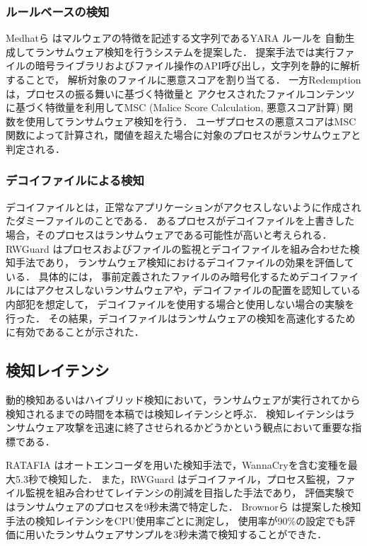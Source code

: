 \subsubsection{ルールベースの検知}
Medhatら \cite{yara-rule} はマルウェアの特徴を記述する文字列であるYARA \cite{yara-rule-doc} ルールを
自動生成してランサムウェア検知を行うシステムを提案した．
提案手法では実行ファイルの暗号ライブラリおよびファイル操作のAPI呼び出し，文字列を静的に解析することで，
解析対象のファイルに悪意スコアを割り当てる．
一方Redemption \cite{kharraz2017redemption} は，プロセスの振る舞いに基づく特徴量と
アクセスされたファイルコンテンツに基づく特徴量を利用してMSC (Malice Score Calculation, 悪意スコア計算) 関数を使用してランサムウェア検知を行う．
ユーザプロセスの悪意スコアはMSC関数によって計算され，閾値を超えた場合に対象のプロセスがランサムウェアと判定される．

\subsubsection{デコイファイルによる検知}
デコイファイルとは，正常なアプリケーションがアクセスしないように作成されたダミーファイルのことである．
あるプロセスがデコイファイルを上書きした場合，そのプロセスはランサムウェアである可能性が高いと考えられる．
RWGuard \cite{mehnaz2018rwguard} はプロセスおよびファイルの監視とデコイファイルを組み合わせた検知手法であり，
ランサムウェア検知におけるデコイファイルの効果を評価している．
具体的には，
事前定義されたファイルのみ暗号化するためデコイファイルにはアクセスしないランサムウェアや，デコイファイルの配置を認知している内部犯を想定して，
デコイファイルを使用する場合と使用しない場合の実験を行った．
その結果，デコイファイルはランサムウェアの検知を高速化するために有効であることが示された．

\subsection{検知レイテンシ}
動的検知あるいはハイブリッド検知において，ランサムウェアが実行されてから検知されるまでの時間を本稿では検知レイテンシと呼ぶ．
検知レイテンシはランサムウェア攻撃を迅速に終了させられるかどうかという観点において重要な指標である．

RATAFIA \cite{alam2019ratafia} はオートエンコーダを用いた検知手法で，WannaCryを含む変種を最大5.3秒で検知した．
また，RWGuard \cite{mehnaz2018rwguard} はデコイファイル，プロセス監視，ファイル監視を組み合わせてレイテンシの削減を目指した手法であり，
評価実験ではランサムウェアのプロセスを9秒未満で特定した．
Brownorら \cite{brownor2024ransomware} は提案した検知手法の検知レイテンシをCPU使用率ごとに測定し，
使用率が90\%の設定でも評価に用いたランサムウェアサンプルを3秒未満で検知することができた．

